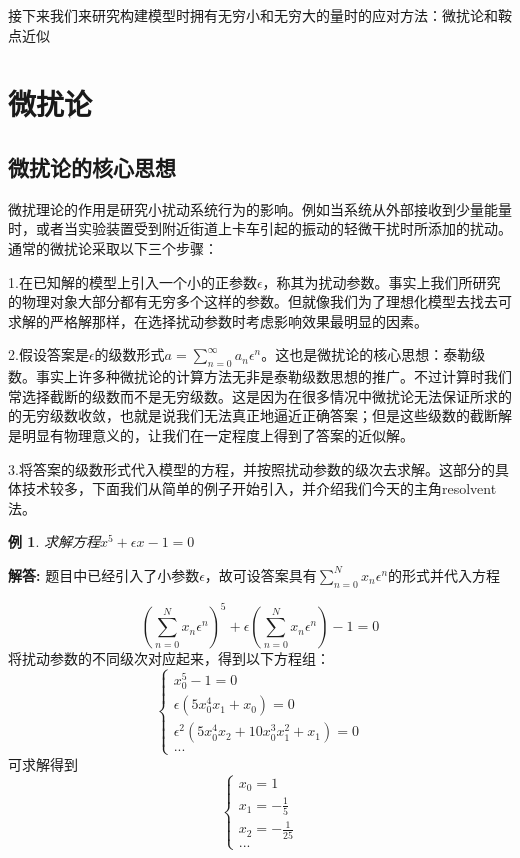 \documentclass[12pt, a4paper, oneside]{ctexart}
\newenvironment{solution}
  {\par\noindent\textbf{解答:}\quad}
  {\par}
\newtheorem{example}[theorem]{例}
\begin{document}
接下来我们来研究构建模型时拥有无穷小和无穷大的量时的应对方法：微扰论和鞍点近似
\newpage
\section{微扰论}
\subsection{微扰论的核心思想}
微扰理论的作用是研究小扰动系统行为的影响。例如当系统从外部接收到少量能量时，或者当实验装置受到附近街道上卡车引起的振动的轻微干扰时所添加的扰动。通常的微扰论采取以下三个步骤：

1.在已知解的模型上引入一个小的正参数$\epsilon$，称其为扰动参数。事实上我们所研究的物理对象大部分都有无穷多个这样的参数。但就像我们为了理想化模型去找去可求解的严格解那样，在选择扰动参数时考虑影响效果最明显的因素。

2.假设答案是$\epsilon$的级数形式$a=\sum_{n=0}^{\infty}a_n\epsilon^n$。这也是微扰论的核心思想：泰勒级数。事实上许多种微扰论的计算方法无非是泰勒级数思想的推广。不过计算时我们常选择截断的级数而不是无穷级数。这是因为在很多情况中微扰论无法保证所求的的无穷级数收敛，也就是说我们无法真正地逼近正确答案；但是这些级数的截断解是明显有物理意义的，让我们在一定程度上得到了答案的近似解。

3.将答案的级数形式代入模型的方程，并按照扰动参数的级次去求解。这部分的具体技术较多，下面我们从简单的例子开始引入，并介绍我们今天的主角resolvent法。

\begin{example}
    求解方程$x^5+\epsilon x-1=0$\\
\end{example}

\begin{solution}
题目中已经引入了小参数$\epsilon$，故可设答案具有$\sum_{n=0}^N x_n \epsilon^n$的形式并代入方程

\begin{equation}
    (\sum_{n=0}^N x_n\epsilon^n)^5+\epsilon(\sum_{n=0}^N x_n\epsilon^n)-1=0
\end{equation}
将扰动参数的不同级次对应起来，得到以下方程组：
\begin{equation}
    \begin{cases}
        x_0^5-1=0\\
        \epsilon(5 x_0^4x_1+ x_0)=0\\
        \epsilon^2(5x_0^4 x_2 + 10x_0^3 x_1^2 + x_1) = 0\\
        ...
    \end{cases}
\end{equation}
可求解得到
\begin{equation}
    \begin{cases}
    x_0=1\\
    x_1=-\frac{1}{5}\\
    x_2=-\frac{1}{25}\\
    ...
\end{cases}
\end{equation}
\end{solution}
\end{document}
